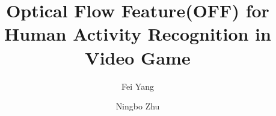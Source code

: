 \documentclass[runningheads,a4paper]{llncs}
\begin{document}

\title{Optical Flow Feature(OFF) for Human Activity Recognition in Video Game}


%
%
\author{Fei Yang \and Ningbo Zhu}



%
%

\maketitle
\end{document}
